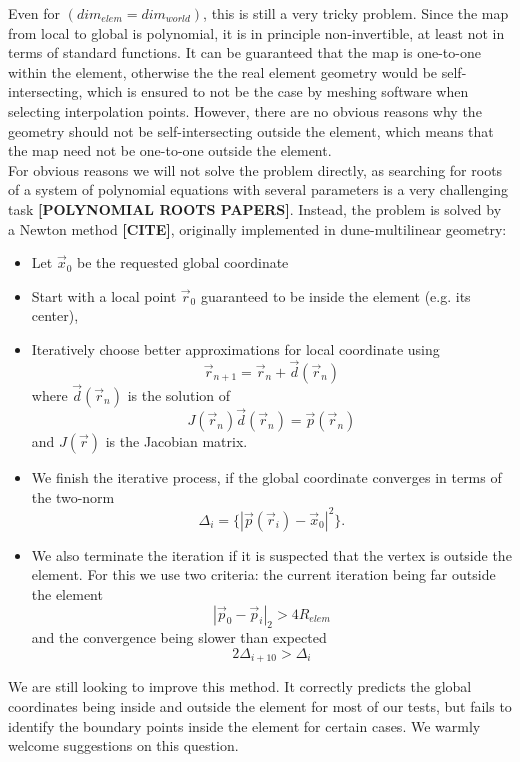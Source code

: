 \noindent
Even for $(dim_{elem} = dim_{world})$, this is still a very tricky problem. Since the map from local to global is polynomial, it is in principle non-invertible, at least not in terms of standard functions. It can be guaranteed that the map is one-to-one within the element, otherwise the the real element geometry would be self-intersecting, which is ensured to not be the case by meshing software when selecting interpolation points. However, there are no obvious reasons why the geometry should not be self-intersecting outside the element, which means that the map need not be one-to-one outside the element. \\

\noindent
For obvious reasons we will not solve the problem directly, as searching for roots of a system of polynomial equations with several parameters is a very challenging task \textbf{[POLYNOMIAL ROOTS PAPERS]}. Instead, the problem is solved by a Newton method \textbf{[CITE]}, originally implemented in dune-multilinear geometry:
\begin{itemize}
	\item Let $\vec{x}_0$ be the requested global coordinate
	\item Start with a local point $\vec{r}_0$ guaranteed to be inside the element (e.g. its center),
	\item Iteratively choose better approximations for local coordinate using \[\vec{r}_{n+1} = \vec{r}_n + \vec{d}(\vec{r}_n)\] where $\vec{d}(\vec{r}_n)$ is the solution of
	        \[ J(\vec{r}_n) \vec{d}(\vec{r}_n) = \vec{p}(\vec{r}_n) \] and $J(\vec{r})$ is the Jacobian matrix.
	\item We finish the iterative process, if the global coordinate converges in terms of the two-norm
	        \[\Delta_i = \{ |\vec{p}(\vec{r}_i) - \vec{x}_0 |^2 \}. \]
	\item We also terminate the iteration if it is suspected that the vertex is outside the element. For this we use two criteria: the current iteration being far outside the element \[|\vec{p}_0 - \vec{p}_i|_2 > 4 R_{elem}\] and the convergence being slower than expected \[ 2 \Delta_{i + 10} > \Delta_{i} \]
\end{itemize}

\noindent
We are still looking to improve this method. It correctly predicts the global coordinates being inside and outside the element for most of our tests, but fails to identify the boundary points inside the element for certain cases. We warmly welcome suggestions on this question.